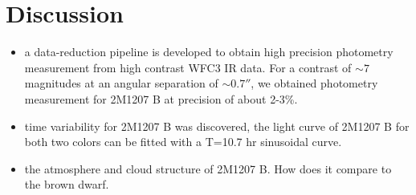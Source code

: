 \documentclass[apj]{emulateapj}
\begin{document}
\section{Discussion }
\begin{itemize}
\item a data-reduction pipeline is developed to obtain high precision
  photometry measurement from high contrast WFC3 IR data. For a
  contrast of $\sim 7$ magnitudes at an angular separation of
  $\sim0.7''$, we obtained photometry measurement for 2M1207 B at
  precision of about 2-3\%. 
\item time variability for 2M1207 B was discovered, the light curve of
  2M1207 B for both two colors can be fitted with a T=10.7 hr
  sinusoidal curve.
\item the atmosphere and cloud structure of 2M1207 B. How does it
  compare to the brown dwarf.
\end{itemize}

\end{document}
